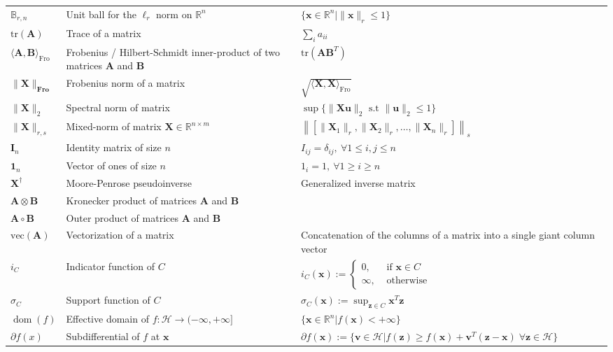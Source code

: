 \documentclass[nobib, a4paper, notoc, twoside, justified, openany]{tufte-book}
\providecommand{\B}[1]{\mathbf{#1}}
\DeclareMathOperator{\dom}{dom}
\begin{document}
\begin{fullwidth}
\begin{longtable}{p{2cm} | p{6cm} | p{9cm}}
  $\mathbb B_{r,n}$ & Unit ball for the $\ell_r$ norm on $\mathbb R^n$ & $\{\B{x} \in \mathbb{R}^n|\|\B{x}\|_r \le 1\}$ \\
$\text{tr}(\B{A})$ & Trace of a matrix & $\sum_{i} a_{ii}$ \\  
$\langle \B{A}, \B{B}\rangle_{\text{Fro}}$ & Frobenius / Hilbert-Schmidt inner-product of two matrices $\B{A}$ and $\B{B}$  & $\text{tr}(\B{A}\B{B}^T)$\\
  $\| \B{X} \|_{\textbf{Fro}}$ & Frobenius norm of a matrix & $\sqrt{\langle \B{X}, \B{X}\rangle_{\text{Fro}}}$ \\
  $\|\B{X}\|_2$ & Spectral norm of matrix & $\sup\{\|\B{X}\B{u}\|_2 \text{ s.t } \|\B{u}\|_2 \le 1\}$ \\
  $\|\B{X}\|_{r,s}$ & Mixed-norm of matrix $\B{X} \in \mathbb R^{n \times m}$ &  $\left\|\left[\|\B{X}_1\|_r,\|\B{X}_2\|_r,\ldots,\|\B{X}_n\|_r\right]\right\|_s$ \\
$\B{I}_n$ & Identity matrix of size $n$ &  $I_{ij} = \delta_{ij}, ~\forall 1 \leq i, j \leq n$\\
$\B{1}_n$ & Vector of ones of size $n$ &  $1_{i} = 1, ~\forall 1 \geq i \geq n$ \\
$\B{X}^{\dagger}$ & Moore-Penrose pseudoinverse & Generalized inverse matrix\\
$\B{A}\otimes\B{B}$ & Kronecker product of matrices $\B{A}$ and $\B{B}$ & \\
$\B{A}\circ\B{B}$ & Outer product of matrices $\B{A}$ and $\B{B}$ & \\

$\text{vec}(\B{A})$ & Vectorization of a matrix & Concatenation of the columns of a matrix into a single giant column vector\\


\midrule
$i_C$ & Indicator function of $C$ & $i_C(\B{x}):= \begin{cases}0,&\mbox{ if }\B{x} \in C\\\infty,&\mbox{ otherwise}\end{cases}$\\
  $\sigma_C$ & Support function of $C$ & $\sigma_C(\B{x}) := \sup_{\B{z} \in C}\B{x}^T\B{z}$\\
  $ \dom(f)$ & Effective domain of $f: \mathcal H \rightarrow (-\infty,+\infty]$ & $\{\B{x} \in \mathbb{R}^n | f(\B{x}) < +\infty\}$ \\  
  $\partial f(x)$ & Subdifferential of $f$ at $\B{x}$ & $\partial f(\B{x}) := \{\B{v} \in \mathcal H | f(\B{z}) \ge f(\B{x}) + \B{v}^T(\B{z} - \B{x})\; \forall \B{z} \in \mathcal H\}$\\


\end{longtable}
\end{fullwidth}
\end{document}
